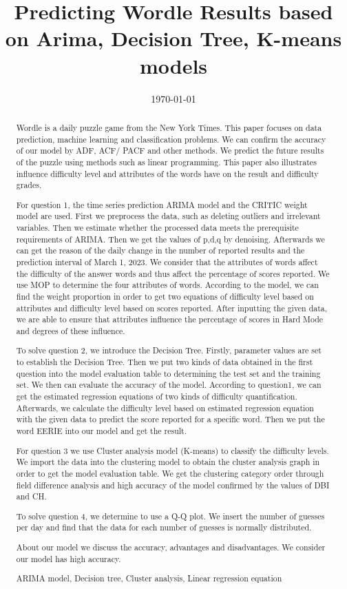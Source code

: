 \documentclass{mcmthesis}
\title{Predicting Wordle Results based on Arima, Decision Tree, K-means models}
\date{\today}
\begin{document}
\begin{abstract}
    Wordle is a daily puzzle game from the New York Times.  This paper focuses on data prediction, machine learning and classification problems.  We can confirm the accuracy of our model by ADF, ACF/ PACF and other methods.  We predict the future results of the puzzle using methods such as linear programming.  This paper also illustrates influence difficulty level and attributes of the words have on the result and difficulty grades.
    
    For question 1, the time series prediction ARIMA model and the CRITIC weight model are used.  First we preprocess the data, such as deleting outliers and irrelevant variables.  Then we estimate whether the processed data meets the prerequisite requirements of ARIMA.  Then we get the values of p,d,q by denoising.  Afterwards we can get the reason of the daily change in the number of reported results and the prediction interval of March 1, 2023.  We consider that the attributes of words affect the difficulty of the answer words and thus affect the percentage of scores reported.  We use MOP to determine the four attributes of words.  According to the model, we can find the weight proportion in order to get two equations of difficulty level based on attributes and difficulty level based on scores reported.  After inputting the given data, we are able to ensure that attributes influence the percentage of scores in Hard Mode and degrees of these influence.

    To solve question 2, we introduce the Decision Tree.  Firstly, parameter values are set to establish the Decision Tree.  Then we put two kinds of data obtained in the first question into the model evaluation table to determining the test set and the training set.  We then can evaluate the accuracy of the model.  According to question1, we can get the estimated regression equations of two kinds of difficulty quantification.  Afterwards, we calculate the difficulty level based on estimated regression equation with the given data to predict the score reported for a specific word.  Then we put the word EERIE into our model and get the result.

    For question 3 we use Cluster analysis model (K-means) to classify the difficulty levels.  We import the data into the clustering model to obtain the cluster analysis graph in order to get the model evaluation table.  We get the clustering category order through field difference analysis  and high accuracy of the model confirmed by the values of DBI and CH.

    To solve question 4, we determine to use a Q-Q plot.  We insert the number of guesses per day and find that the data for each number of guesses is normally distributed.

    About our model we discuss the accuracy, advantages and disadvantages.  We consider our model has high accuracy.
    
\begin{keywords}
 ARIMA model, Decision tree, Cluster analysis, Linear regression equation  
\end{keywords}

\end{abstract}
\end{document}

